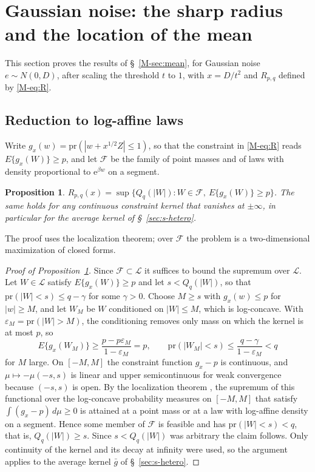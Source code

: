 \documentclass[11pt]{article}
\renewcommand{\_}{\usc\allowbreak}
\newtheorem{proposition}{Proposition}
\newcommand{\pr}{\mathrm{pr}}
\newcommand{\LC}{\mathcal{L}}
\begin{document}
\section{Gaussian noise: the sharp radius and the location of the mean}\label{sec:s-gauss}

This section proves the results of \S~\ref{M-sec:mean}, for Gaussian noise $e \sim N(0, D)$, after scaling the threshold $t$ to $1$, with $x = D/t^2$ and $R_{p,q}$ defined by \eqref{M-eq:R}.

\subsection*{Reduction to log-affine laws}

Write $g_x(w) = \pr(|w + x^{1/2}Z| \le 1)$, so that the constraint in \eqref{M-eq:R} reads $E\{g_x(W)\} \ge p$, and let $\mathcal F$ be the family of point masses and of laws with density proportional to $\mathrm{e}^{\beta w}$ on a segment.

\begin{proposition}\label{prop:reduction}
$R_{p,q}(x) = \sup\{Q_q(|W|) : W \in \mathcal F,\ E\{g_x(W)\} \ge p\}$. The same holds for any continuous constraint kernel that vanishes at $\pm\infty$, in particular for the average kernel of \S~\ref{sec:s-hetero}.
\end{proposition}

The proof uses the localization theorem; over $\mathcal F$ the problem is a two-dimensional maximization of closed forms.

\begin{proof}[Proof of Proposition~\ref{prop:reduction}]
Since $\mathcal F \subset \LC$ it suffices to bound the supremum over $\LC$. Let $W \in \LC$ satisfy $E\{g_x(W)\} \ge p$ and let $s < Q_q(|W|)$, so that $\pr(|W| < s) \le q - \gamma$ for some $\gamma > 0$. Choose $M \ge s$ with $g_x(w) \le p$ for $|w| \ge M$, and let $W_M$ be $W$ conditioned on $|W| \le M$, which is log-concave. With $\varepsilon_M = \pr(|W| > M)$, the conditioning removes only mass on which the kernel is at most $p$, so
\[
E\{g_x(W_M)\} \ge \frac{p - p\varepsilon_M}{1 - \varepsilon_M} = p, \qquad \pr(|W_M| < s) \le \frac{q - \gamma}{1-\varepsilon_M} < q
\]
for $M$ large. On $[-M, M]$ the constraint function $g_x - p$ is continuous, and $\mu \mapsto -\mu(-s, s)$ is linear and upper semicontinuous for weak convergence because $(-s,s)$ is open. By the localization theorem \citep{kannan1995, fradelizi2004}, the supremum of this functional over the log-concave probability measures on $[-M, M]$ that satisfy $\int(g_x - p)\,d\mu \ge 0$ is attained at a point mass or at a law with log-affine density on a segment. Hence some member of $\mathcal F$ is feasible and has $\pr(|W| < s) < q$, that is, $Q_q(|W|) \ge s$. Since $s < Q_q(|W|)$ was arbitrary the claim follows. Only continuity of the kernel and its decay at infinity were used, so the argument applies to the average kernel $\bar g$ of \S~\ref{sec:s-hetero}.
\end{proof}
\end{document}
